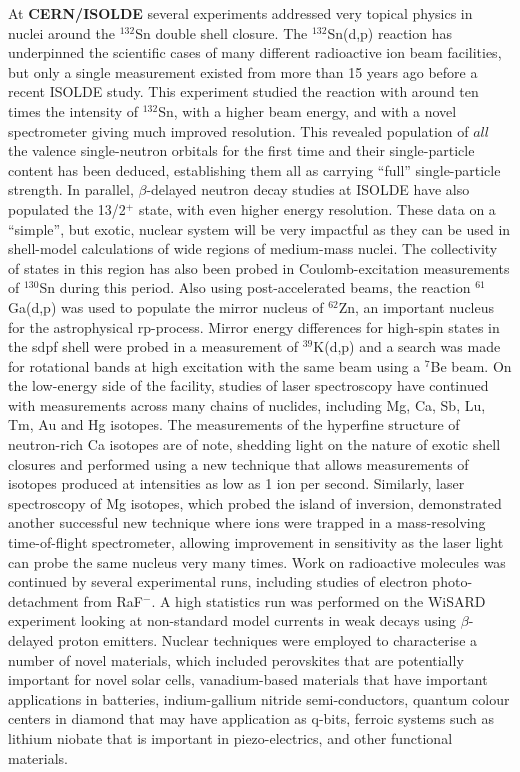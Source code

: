 At \textbf{CERN/ISOLDE} several experiments addressed very topical physics in nuclei around the $^{132}$Sn double shell closure. The $^{132}$Sn(d,p) reaction has underpinned the scientific cases of many different radioactive ion beam facilities, but only a single measurement existed from more than 15 years ago before a recent ISOLDE study. This experiment studied the reaction with around ten times the intensity of $^{132}$Sn, with a higher beam energy, and with a novel spectrometer giving much improved resolution. This revealed population of $all$ the valence single-neutron orbitals for the first time and their single-particle content has been deduced, establishing them all as carrying “full” single-particle strength. In parallel, $\beta$-delayed neutron decay studies at ISOLDE have also populated the 13/2$^+$ state, with even higher energy resolution. These data on a “simple”, but exotic, nuclear system will be very impactful as they can be used in shell-model calculations of wide regions of medium-mass nuclei. The collectivity of states in this region has also been probed in Coulomb-excitation measurements of $^{130}$Sn during this period. Also using post-accelerated beams, the reaction $^{61}$Ga(d,p) was used to populate the mirror nucleus of $^{62}$Zn, an important nucleus for the astrophysical rp-process. Mirror energy differences for high-spin states in the sdpf shell were probed in a measurement of $^{39}$K(d,p) and a search was made for rotational bands at high excitation with the same beam using a $^7$Be beam. On the low-energy side of the facility, studies of laser spectroscopy have continued with measurements across many chains of nuclides, including Mg, Ca, Sb, Lu, Tm, Au and Hg isotopes. The measurements of the hyperfine structure of neutron-rich Ca isotopes are of note, shedding light on the nature of exotic shell closures and performed using a new technique that allows measurements of isotopes produced at intensities as low as 1 ion per second. Similarly, laser spectroscopy of Mg isotopes, which probed the island of inversion, demonstrated another successful new technique where ions were trapped in a mass-resolving time-of-flight spectrometer, allowing improvement in sensitivity as the laser light can probe the same nucleus very many times. Work on radioactive molecules was continued by several experimental runs, including studies of electron photo-detachment from RaF$^-$. A high statistics run was performed on the WiSARD experiment looking at non-standard model currents in weak decays using $\beta$-delayed proton emitters. Nuclear techniques were employed to characterise a number of novel materials, which included perovskites that are potentially important for novel solar cells, vanadium-based materials that have important applications in batteries, indium-gallium nitride semi-conductors, quantum colour centers in diamond that may have application as q-bits, ferroic systems such as lithium niobate that is important in piezo-electrics, and other functional materials.

